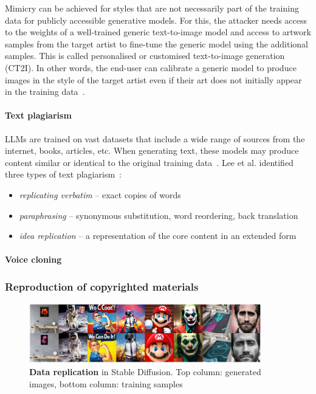 \documentclass[conference]{IEEEtran}
\begin{document}
Mimicry can be achieved for styles that are not necessarily part of the training data for publicly accessible generative models. For this, the attacker needs access to the weights of a well-trained generic text-to-image model and access to artwork samples from the target artist to fine-tune the generic model using the additional samples. 
This is called personalised or customised text-to-image generation (CT2I).
In other words, the end-user can calibrate a generic model to produce images in the style of the target artist even if their art does not initially appear in the training data~\cite{ruiz_dreambooth_2023,gal_image_2022}. 

\paragraph{Text plagiarism}
LLMs are trained on vast datasets that include a wide range of sources from the internet, books, articles, etc. 
When generating text, these models may produce content similar or identical to the original training data~\cite{carlini_extracting_2021,mccoy_how_2023}.
Lee et al. identified three types of text plagiarism~\cite{lee_language_2023}:
\begin{itemize}
    \item \textit{replicating verbatim} -- exact copies of words
    \item \textit{paraphrasing} -- synonymous substitution, word reordering, back translation 
    \item \textit{idea replication} -- a representation of the core content in an extended form
\end{itemize}
    \paragraph{Voice cloning}

\subsubsection{Reproduction of copyrighted materials} 
    \begin{figure}[ht]
    \centering
    \includegraphics[width=0.9\textwidth]{figures/replicate_userprompts.JPG}
    \caption{\textbf{Data replication} in Stable Diffusion. Top column: generated images, bottom column: training samples~\cite{somepalli_understanding_2023}}
    \label{fig:replication-user}
\end{figure}
\end{document}
